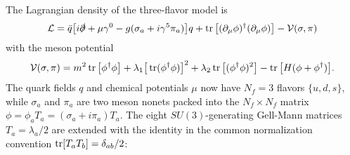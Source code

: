 The Lagrangian density of the three-flavor model is \cite{ref:lsm3f}
\begin{equation}
	\mathcal{L} = \bar{q} \big[ i \slashed\partial + \mu \gamma^0 - g (\sigma_a + i \gamma^5 \pi_a) \big] q + \operatorname{tr}\big[(\partial_\mu \phi)^\dagger (\partial_\mu \phi)\big] - \mathcal{V}(\sigma, \pi)
\label{eq:lsm:lagrangian3f}
\end{equation}
with the meson potential
\begin{equation}
	\mathcal{V}(\sigma, \pi) = m^2 \operatorname{tr}\big[\phi^\dagger \phi\big] + \lambda_1 \big[\operatorname{tr}(\phi^\dagger \phi)\big]^2 + \lambda_2 \operatorname{tr}\big[(\phi^\dagger \phi)^2\big] - \operatorname{tr}\big[H(\phi+\phi^\dagger)\big].
\label{eq:lsm:potential3f}
\end{equation}
The quark fields $q$ and chemical potentials $\mu$ now have $N_f=3$ flavors $\{u,d,s\}$,
while $\sigma_a$  and $\pi_a$  are two meson nonets packed into the $N_f \times N_f$ matrix $\phi = \phi_a T_a = (\sigma_a + i \pi_a) T_a$.
The eight $SU(3)$-generating Gell-Mann matrices $T_a = \lambda_a/2$ are extended with the identity in the common normalization convention $\operatorname{tr}[T_a T_b] = \delta_{ab}/2$:
